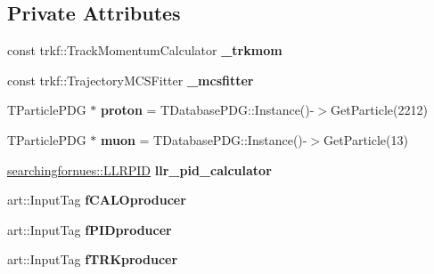 \subsection*{Private Attributes}
\begin{DoxyCompactItemize}
\item 
const trkf\+::\+Track\+Momentum\+Calculator {\bfseries \+\_\+trkmom}\hypertarget{classanalysis_1_1TrackAnalysis_a22599de9de269967cfdfb8490fcc3897}{}\label{classanalysis_1_1TrackAnalysis_a22599de9de269967cfdfb8490fcc3897}

\item 
const trkf\+::\+Trajectory\+M\+C\+S\+Fitter {\bfseries \+\_\+mcsfitter}\hypertarget{classanalysis_1_1TrackAnalysis_a97631d64480702a4b7589a5bb9d735aa}{}\label{classanalysis_1_1TrackAnalysis_a97631d64480702a4b7589a5bb9d735aa}

\item 
T\+Particle\+P\+DG $\ast$ {\bfseries proton} = T\+Database\+P\+D\+G\+::\+Instance()-\/$>$Get\+Particle(2212)\hypertarget{classanalysis_1_1TrackAnalysis_a4adc7f89c334ab93747a8d4c4abbcc6d}{}\label{classanalysis_1_1TrackAnalysis_a4adc7f89c334ab93747a8d4c4abbcc6d}

\item 
T\+Particle\+P\+DG $\ast$ {\bfseries muon} = T\+Database\+P\+D\+G\+::\+Instance()-\/$>$Get\+Particle(13)\hypertarget{classanalysis_1_1TrackAnalysis_a0fe3b9e7864aaaa36b5f52826b4e3eb9}{}\label{classanalysis_1_1TrackAnalysis_a0fe3b9e7864aaaa36b5f52826b4e3eb9}

\item 
\hyperlink{classsearchingfornues_1_1LLRPID}{searchingfornues\+::\+L\+L\+R\+P\+ID} {\bfseries llr\+\_\+pid\+\_\+calculator}\hypertarget{classanalysis_1_1TrackAnalysis_a9aa071870faf165eb6548f0ea16e4132}{}\label{classanalysis_1_1TrackAnalysis_a9aa071870faf165eb6548f0ea16e4132}

\item 
art\+::\+Input\+Tag {\bfseries f\+C\+A\+L\+Oproducer}\hypertarget{classanalysis_1_1TrackAnalysis_a0ceaf940b041eda0237cc73cd330d18d}{}\label{classanalysis_1_1TrackAnalysis_a0ceaf940b041eda0237cc73cd330d18d}

\item 
art\+::\+Input\+Tag {\bfseries f\+P\+I\+Dproducer}\hypertarget{classanalysis_1_1TrackAnalysis_a349dc117e508190c619cd9f47ea7647e}{}\label{classanalysis_1_1TrackAnalysis_a349dc117e508190c619cd9f47ea7647e}

\item 
art\+::\+Input\+Tag {\bfseries f\+T\+R\+Kproducer}\hypertarget{classanalysis_1_1TrackAnalysis_a45abdcf3140e68a2ce90501e33a00eb3}{}\label{classanalysis_1_1TrackAnalysis_a45abdcf3140e68a2ce90501e33a00eb3}


\end{DoxyCompactItemize}
